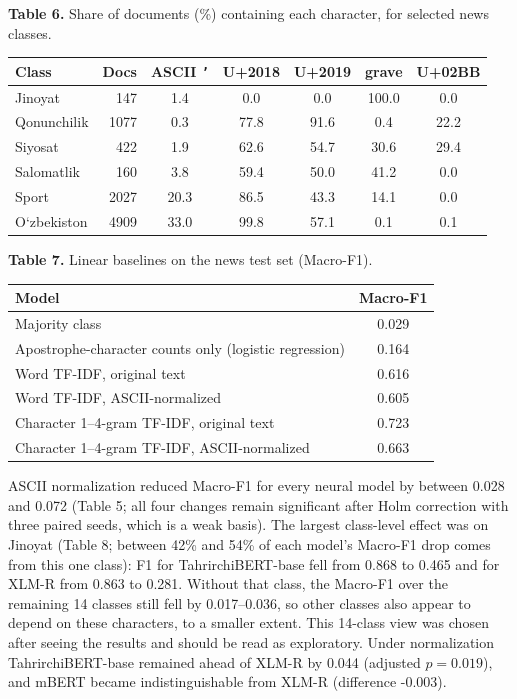 \documentclass[11pt]{book}
\begin{document}
\begin{center}
\textbf{Table 6.} Share of documents (\%) containing each character, for selected news classes.\\[2pt]
\begin{tabular}{lrccccc}
\hline
Class & Docs & ASCII \texttt{'} & U+2018 & U+2019 & grave & U+02BB \\
\hline
Jinoyat & 147 & 1.4 & 0.0 & 0.0 & 100.0 & 0.0 \\
Qonunchilik & 1077 & 0.3 & 77.8 & 91.6 & 0.4 & 22.2 \\
Siyosat & 422 & 1.9 & 62.6 & 54.7 & 30.6 & 29.4 \\
Salomatlik & 160 & 3.8 & 59.4 & 50.0 & 41.2 & 0.0 \\
Sport & 2027 & 20.3 & 86.5 & 43.3 & 14.1 & 0.0 \\
O\textquoteleft zbekiston & 4909 & 33.0 & 99.8 & 57.1 & 0.1 & 0.1 \\
\hline
\end{tabular}
\end{center}

\begin{center}
\textbf{Table 7.} Linear baselines on the news test set (Macro-F1).\\[2pt]
\begin{tabular}{lc}
\hline
Model & Macro-F1 \\
\hline
Majority class & 0.029 \\
Apostrophe-character counts only (logistic regression) & 0.164 \\
Word TF-IDF, original text & 0.616 \\
Word TF-IDF, ASCII-normalized & 0.605 \\
Character 1--4-gram TF-IDF, original text & 0.723 \\
Character 1--4-gram TF-IDF, ASCII-normalized & 0.663 \\
\hline
\end{tabular}
\end{center}

ASCII normalization reduced Macro-F1 for every neural model by between 0.028 and 0.072 (Table 5; all four changes remain significant after Holm correction with three paired seeds, which is a weak basis). The largest class-level effect was on Jinoyat (Table 8; between 42\% and 54\% of each model's Macro-F1 drop comes from this one class): F1 for TahrirchiBERT-base fell from 0.868 to 0.465 and for XLM-R from 0.863 to 0.281. Without that class, the Macro-F1 over the remaining 14 classes still fell by 0.017--0.036, so other classes also appear to depend on these characters, to a smaller extent. This 14-class view was chosen after seeing the results and should be read as exploratory. Under normalization TahrirchiBERT-base remained ahead of XLM-R by 0.044 (adjusted $p=0.019$), and mBERT became indistinguishable from XLM-R (difference -0.003).
\end{document}
